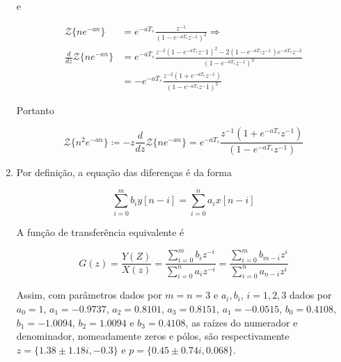 \documentclass[twoside, fleqn]{article}
\begin{document}
\begin{enumerate}
        e
        
            \begin{equation}
                \begin{split}
                    \mathcal{Z}\{n e^{-an}\} & = e^{-a T_s} \frac{z^{-1}}{(1 - e^{-a T_s} z^{-1})^2} \Rightarrow \\ \frac{d}{dz} \mathcal{Z}\{n e^{-an}\} & = e^{- a T_s} \frac{z^{-2}(1 - e^{-a T_s} z^-1)^2 - 2(1 - e^{-a T_s} z^{-1}) e^{-a T_s} z^{-2}}{(1 - e^{-a T_s} z^{-1})^3} \\ 
                    & = - e^{-a T_s} \frac{z^{-2} (1 + e^{-a T_s} z^{-1})}{(1 - e^{- a T_s} z^-1)^3}
                \end{split}
            \end{equation}
        
        Portanto 
        
            \begin{equation}
                \mathcal{Z}\{n^2 e^{-a n}\} \coloneqq -z \frac{d}{dz} \mathcal{Z}\{n e^{-a n}\} = e^{-a T_s} \frac{z^{-1}(1 + e^{-a T_s} z^{-1})}{(1 - e^{-a T_s} z^{-1})}
            \end{equation}
        
        \item %
        
        Por definição, a equação das diferenças é da forma
        
            \begin{equation}
                \sum_{i=0}^{m} b_i y[n-i] = \sum_{i=0}^{n} a_i x[n-i]
            \end{equation}
        
        A função de transferência equivalente é
        
            \begin{equation}
                G(z) = \frac{Y(Z)}{X(z)} = \frac{\sum_{i=0}^{m} b_{i} z^{-i}}{\sum_{i=0}^{n} a_{i} z^{-i}} = \frac{\sum_{i=0}^{m} b_{m-i} z^{i}}{\sum_{i=0}^{n} a_{n-i} z^{i}}
            \end{equation}
        
        Assim, com parâmetros dados por $m = n = 3$ e $a_i, b_i$, $i = 1, 2, 3$ dados por $a_0 = 1$, $a_1 = -0.9737$, $a_2 = 0.8101$, $a_3 = 0.8151$, $a_1 = -0.0515$, $b_0 = 0.4108$, $b_1 = -1.0094$, $b_2 = 1.0094$ e $b_3 = 0.4108$, as raízes do numerador e denominador, nomeadamente zeros e pólos, são respectivamente $z = \{1.38 \pm 1.18 i, -0.3\}$ e $p = \{0.45 \pm 0.74i, 0.068\}$.
        

\end{enumerate}
\end{document}
